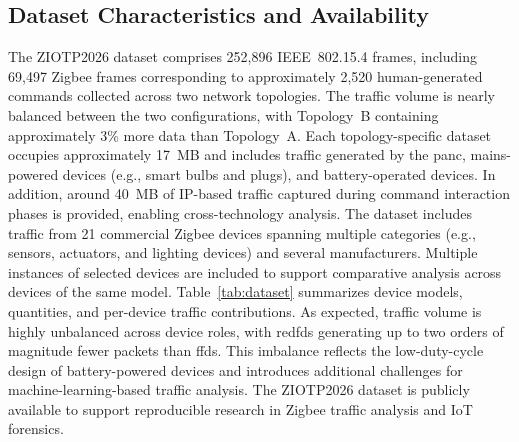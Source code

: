 \subsection{Dataset Characteristics and Availability}
The ZIOTP2026 dataset comprises 252,896 IEEE~802.15.4 frames, including 69,497 Zigbee frames corresponding to approximately 2,520 human-generated commands collected across two network topologies. The traffic volume is nearly balanced between the two configurations, with Topology~B containing approximately 3\% more data than Topology~A. Each topology-specific dataset occupies approximately 17~MB and includes traffic generated by the \gls*{panc}, mains-powered devices (e.g., smart bulbs and plugs), and battery-operated devices. In addition, around 40~MB of IP-based traffic captured during command interaction phases is provided, enabling cross-technology analysis.
The dataset includes traffic from 21 commercial Zigbee devices spanning multiple categories (e.g., sensors, actuators, and lighting devices) and several manufacturers. Multiple instances of selected devices are included to support comparative analysis across devices of the same model. Table~\ref{tab:dataset} summarizes device models, quantities, and per-device traffic contributions. As expected, traffic volume is highly unbalanced across device roles, with \glspl*{redfd} generating up to two orders of magnitude fewer packets than \glspl*{ffd}. This imbalance reflects the low-duty-cycle design of battery-powered devices and introduces additional challenges for machine-learning-based traffic analysis.
The ZIOTP2026 dataset is publicly available to support reproducible research in Zigbee traffic analysis and IoT forensics.

